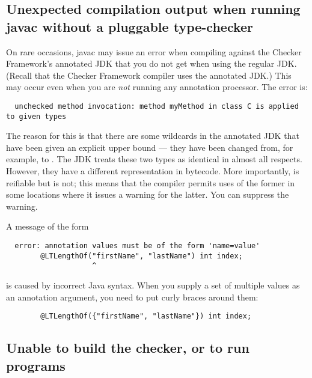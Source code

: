 \subsection{Unexpected compilation output when running javac without a pluggable type-checker\label{common-problems-running-javac}}

On rare occasions, javac may issue an error when compiling against the
Checker Framework's annotated JDK that you do not get when using the
regular JDK\@.  (Recall that the Checker Framework compiler uses the
annotated JDK\@.)  This may occur even when you are \emph{not} running any
annotation processor.  The error is:

\begin{Verbatim}
  unchecked method invocation: method myMethod in class C is applied to given types
\end{Verbatim}

The reason for this is that there are some wildcards in the annotated JDK
that have been given an explicit upper bound --- they have been changed
from, for example,  to .  The
JDK treats these two types as identical in almost all respects.  However,
they have a different representation in bytecode.  More importantly,
 is reifiable but  is not; this
means that the compiler permits uses of the former in some locations where
it issues a warning for the latter.  You can suppress the warning.

A message of the form

\begin{Verbatim}
  error: annotation values must be of the form 'name=value'
        @LTLengthOf("firstName", "lastName") int index;
                    ^
\end{Verbatim}

\noindent
is caused by incorrect Java syntax.  When you supply a set of multiple
values as an annotation argument, you need to put curly braces around them:

\begin{Verbatim}
        @LTLengthOf({"firstName", "lastName"}) int index;
\end{Verbatim}


\subsection{Unable to build the checker, or to run programs\label{common-problems-running-java}}

